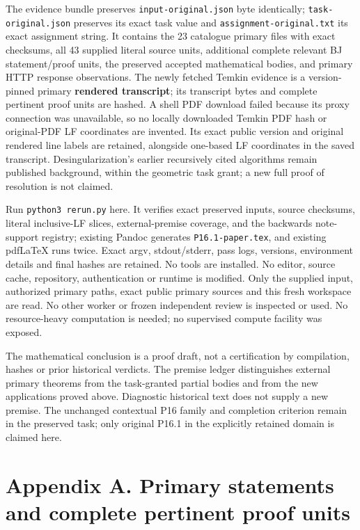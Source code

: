 \documentclass[
  10pt,
]{article}
\begin{document}
The evidence bundle preserves \texttt{input-original.json} byte
identically; \texttt{task-original.json} preserves its exact task value
and \texttt{assignment-original.txt} its exact assignment string. It
contains the 23 catalogue primary files with exact checksums, all 43
supplied literal source units, additional complete relevant BJ
statement/proof units, the preserved accepted mathematical bodies, and
primary HTTP response observations. The newly fetched Temkin evidence is
a version-pinned primary \textbf{rendered transcript}; its transcript
bytes and complete pertinent proof units are hashed. A shell PDF
download failed because its proxy connection was unavailable, so no
locally downloaded Temkin PDF hash or original-PDF LF coordinates are
invented. Its exact public version and original rendered line labels are
retained, alongside one-based LF coordinates in the saved transcript.
Desingularization's earlier recursively cited algorithms remain
published background, within the geometric task grant; a new full proof
of resolution is not claimed.

Run \texttt{python3\ rerun.py} here. It verifies exact preserved inputs,
source checksums, literal inclusive-LF slices, external-premise
coverage, and the backwards note-support registry; existing Pandoc
generates \texttt{P16.1-paper.tex}, and existing pdfLaTeX runs twice.
Exact argv, stdout/stderr, pass logs, versions, environment details and
final hashes are retained. No tools are installed. No editor, source
cache, repository, authentication or runtime is modified. Only the
supplied input, authorized primary paths, exact public primary sources
and this fresh workspace are read. No other worker or frozen independent
review is inspected or used. No resource-heavy computation is needed; no
supervised compute facility was exposed.

The mathematical conclusion is a proof draft, not a certification by
compilation, hashes or prior historical verdicts. The premise ledger
distinguishes external primary theorems from the task-granted partial
bodies and from the new applications proved above. Diagnostic historical
text does not supply a new premise. The unchanged contextual P16 family
and completion criterion remain in the preserved task; only original
P16.1 in the explicitly retained domain is claimed here.

\section{Appendix A. Primary statements and complete pertinent proof
units}\label{appendix-a.-primary-statements-and-complete-pertinent-proof-units}
\end{document}
